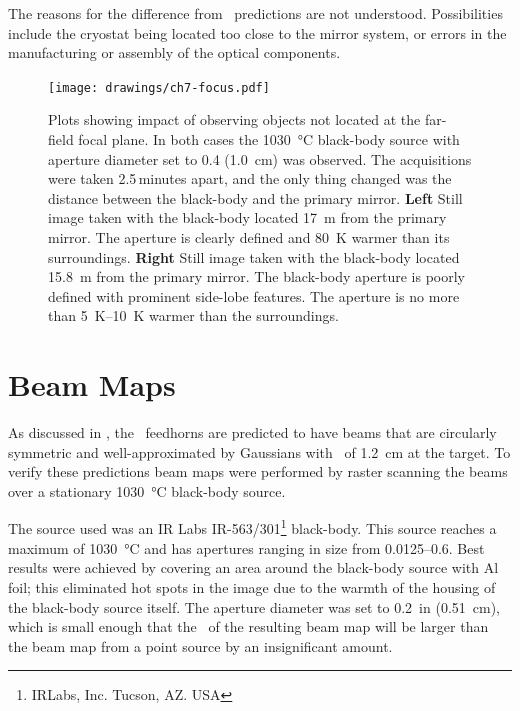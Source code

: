 The reasons for the difference from \ZEMAX\ predictions are not understood.
Possibilities include the cryostat being located too close to the mirror system, or errors in the manufacturing or assembly of the optical components.

\begin{figure}
\centering
\texttt{[image: drawings/ch7-focus.pdf]}
\caption[Focus distance plots]{
  Plots showing impact of observing objects not located at the far-field focal plane.
  In both cases the \SI{1030}{\celsius} black-body source with aperture diameter set to \SI{0.4}{\in} (\SI{1.0}{\cm}) was observed. The acquisitions were taken 2.5\,minutes apart, and the only thing changed was the distance between the black-body and the primary mirror.
  \textbf{Left} Still image taken with the black-body located \SI{17}{\m} from the primary mirror.
  The aperture is clearly defined and \SI{80}{\K} warmer than its surroundings.
  \textbf{Right} Still image taken with the black-body located \SI{15.8}{\m} from the primary mirror.
  The black-body aperture is poorly defined with prominent side-lobe features.
  The aperture is no more than \SIrange{5}{10}{\K} warmer than the surroundings.
}
\label{fig:ch7-focus}
\end{figure}

\section{Beam Maps} \label{sec:ch7-beam-maps}

As discussed in , the \Imager\ feedhorns are predicted to have beams that are circularly symmetric and well-approximated by Gaussians with \FWHM\ of \SI{1.2}{\cm} at the target.
To verify these predictions beam maps were performed by raster scanning the beams over a stationary \SI{1030}{\celsius} black-body source.

The source used was an IR Labs IR-563/301\footnote{IRLabs, Inc. Tucson, AZ. USA} black-body.
This source reaches a maximum of \SI{1030}{\celsius} and has apertures ranging in size from \SIrange{0.0125}{0.6}{\in}.
Best results were achieved by covering an area around the black-body source with Al foil; this eliminated hot spots in the image due to the warmth of the housing of the black-body source itself.
The aperture diameter was set to \SI{0.2}{in} (\SI{0.51}{\cm}), which is small enough that the \FWHM\ of the resulting beam map will be larger than the beam map from a point source by an insignificant amount.

